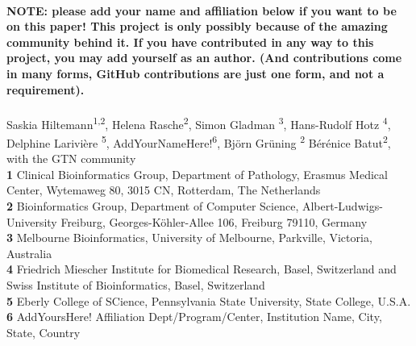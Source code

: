 \documentclass[10pt,letterpaper]{article}
\begin{document}
\vspace*{0.2in}

\begin{flushleft}
{\Large
\textbf{} %
}
\newline
\\
\color{blue} \textbf{NOTE: please add your name and affiliation below if you want to be on this paper! This project is only possibly because of the amazing community behind it. If you have contributed in any way to this project, you may add yourself as an author. (And contributions come in many forms, GitHub contributions are just one form, and not a requirement). } \\
\color{black}
\ \\
Saskia Hiltemann\textsuperscript{1,2\Yinyang\textpilcrow},
Helena Rasche\textsuperscript{2\Yinyang},
Simon Gladman \textsuperscript{3},
Hans-Rudolf Hotz \textsuperscript{4},
Delphine Larivière \textsuperscript{5},
\color{blue}AddYourNameHere!\textsuperscript{6}\color{black},
Björn Grüning \textsuperscript{2\ddag}
Bérénice Batut\textsuperscript{2\ddag},
with the GTN community
\\
\bigskip
\textbf{1} Clinical Bioinformatics Group, Department of Pathology, Erasmus Medical Center, Wytemaweg 80, 3015 CN, Rotterdam, The Netherlands \\
\textbf{2} Bioinformatics Group, Department of Computer Science, Albert-Ludwigs-University Freiburg, Georges-Köhler-Allee 106, Freiburg 79110, Germany \\
\textbf{3} Melbourne Bioinformatics, University of Melbourne, Parkville, Victoria, Australia \\
\textbf{4} Friedrich Miescher Institute for Biomedical Research, Basel, Switzerland and Swiss Institute of Bioinformatics, Basel, Switzerland \\
\textbf{5} Eberly College of SCience, Pennsylvania State University, State College, U.S.A. \\
\color{blue}\textbf{6} AddYoursHere! Affiliation Dept/Program/Center, Institution Name, City, State, Country \color{black}\\
\bigskip


\end{flushleft}
\end{document}
